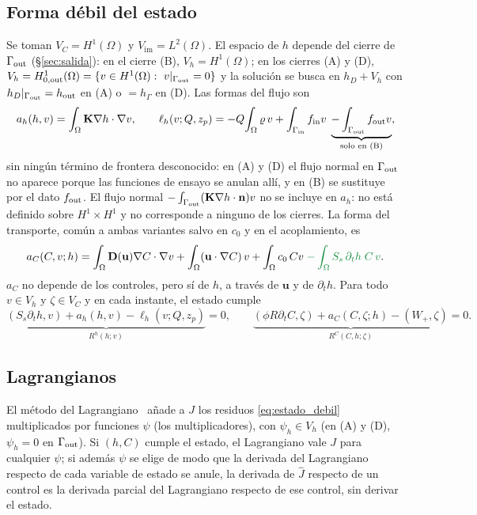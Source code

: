 \documentclass[11pt]{article}
\numberwithin{equation}{section}
\theoremstyle{plain}
\theoremstyle{definition}
\theoremstyle{remark}
\newcommand{\bu}{\mathbf{u}}
\newcommand{\bK}{\mathbf{K}}
\newcommand{\bD}{\mathbf{D}}
\newcommand{\bn}{\mathbf{n}}
\newcommand{\Nuc}{\varrho}                      %
\newcommand{\im}{\mathrm{im}}
\newcommand{\alm}[1]{{\color{cAlm}#1}}
\begin{document}
\subsection{Forma débil del estado}
Se toman $V_C=H^1(\Omega)$ y $V_{\im}=L^2(\Omega)$. El espacio de $h$ depende del cierre de $\Gamma_{\rm out}$ (\S\ref{sec:salida}): en el cierre (B), $V_h=H^1(\Omega)$;
en los cierres (A) y (D), $V_h=H^1_{0,\rm out}(\Omega)=\{v\in H^1(\Omega):\ v|_{\Gamma_{\rm out}}=0\}$ y la solución se busca en $h_D+V_h$ con $h_D|_{\Gamma_{\rm out}}=h_{\rm out}$ en (A) o $=h_\Gamma$ en (D). Las formas del flujo son
\begin{equation}
a_h(h,v)=\int_\Omega\bK\nabla h\cdot\nabla v,\qquad
\ell_h(v;Q,z_p)=-Q\!\int_\Omega\Nuc\, v+\int_{\Gamma_{\rm in}}f_{\rm in}v\;\underbrace{-\int_{\Gamma_{\rm out}}f_{\rm out}v}_{\text{solo en (B)}} ,
\label{eq:forma_h}
\end{equation}
sin ningún término de frontera desconocido: en (A) y (D) el flujo normal en $\Gamma_{\rm out}$ no aparece porque las funciones de ensayo se anulan allí, y en (B) se sustituye por el dato $f_{\rm out}$.
El flujo normal $-\int_{\Gamma_{\rm out}}(\bK\nabla h\cdot\bn)v$ no se incluye en $a_h$: no está definido sobre $H^1\times H^1$ y no corresponde a ninguno de los cierres.
La forma del transporte, común a ambas variantes salvo en $c_0$ y en el acoplamiento, es
\begin{equation}
a_C(C,v;h)=\int_\Omega\bD(\bu)\nabla C\cdot\nabla v+\int_\Omega(\bu\cdot\nabla C)\,v
+\int_\Omega c_0\,Cv\;\alm{-\int_\Omega S_s\,\partial_th\;C\,v}.
\label{eq:aC}
\end{equation}
$a_C$ no depende de los controles, pero sí de $h$, a través de $\bu$ y de $\partial_th$. Para todo $v\in V_h$ y
$\zeta\in V_C$ y en cada instante, el estado cumple
\begin{equation}
\underbrace{(S_s\partial_th,v)+a_h(h,v)-\ell_h(v;Q,z_p)}_{R^h(h;v)}=0,\qquad
\underbrace{(\phi R\partial_tC,\zeta)+a_C(C,\zeta;h)-(W_+,\zeta)}_{R^C(C,h;\zeta)}=0 .
\label{eq:estado_debil}
\end{equation}

\subsection{Lagrangianos}
El método del Lagrangiano~\cite{troltzsch2010,hinze2009,manzoni2021} añade a $J$ los residuos \eqref{eq:estado_debil} multiplicados por funciones $\psi$ (los
multiplicadores), con $\psi_h\in V_h$ (en (A) y (D), $\psi_h=0$ en $\Gamma_{\rm out}$). Si $(h,C)$ cumple el estado, el Lagrangiano vale $J$ para cualquier $\psi$; si además $\psi$ se elige de
modo que la derivada del Lagrangiano respecto de cada variable de estado se anule, la derivada de $\hat J$ respecto de un control es la derivada
parcial del Lagrangiano respecto de ese control, sin derivar el estado.
\end{document}
